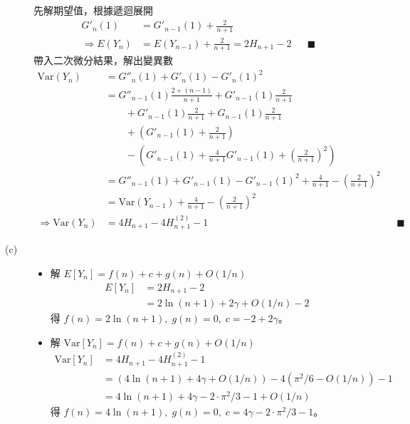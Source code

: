 \documentclass[11pt,fleqn]{article}
\begin{document}
\begin{description}
		先解期望值，根據遞迴展開
		\begin{align*}
			{G}'_n(1) &= {G}'_{n-1}(1) + \frac{2}{n+1} \\
			\Rightarrow
				E(Y_n) &= E(Y_{n-1}) + \frac{2}{n+1} = 2 H_{n+1} - 2 && \blacksquare
		\end{align*}
		帶入二次微分結果，解出變異數
		\begin{align*}
			\text{Var}(Y_n) &= {G}''_n(1) + {G}'_n(1) - {G}'_n(1)^2 \\
			&= {G}''_{n-1}(1) \frac{2 + (n-1)}{n+1} + {G}'_{n-1}(1) \frac{2}{n+1} \\
			& \qquad + {G}'_{n-1}(1)\frac{2}{n+1} + G_{n-1}(1) \frac{2}{n+1} \\
			& \qquad + \left( {G}'_{n-1}(1) + \frac{2}{n+1} \right)\\
			& \qquad - \left( {G}'_{n-1}(1) + \frac{4}{n+1} {G}'_{n-1}(1) + \left(\frac{2}{n+1}\right)^2 \right) \\
			&= {G}''_{n-1}(1) + {G}'_{n-1}(1) - {G}'_{n-1}(1)^2 + \frac{4}{n+1} - \left(\frac{2}{n+1}\right)^2 \\
			&= \text{Var}(Y_{n-1}) + \frac{4}{n+1} - \left(\frac{2}{n+1}\right)^2 \\
			\Rightarrow
				\text{Var}(Y_n) &= 4 H_{n+1} - 4 H^{(2)}_{n+1} - 1 && \blacksquare
		\end{align*}
	\item[(c)] 
		\begin{itemize}
			\item 解 $E[Y_n] = f(n) + c + g(n) + O(1/n)$
			\begin{align*}
				E[Y_n] 
				&= 2 H_{n+1} - 2 \\
				&= 2 \ln (n+1) + 2 \gamma + O(1/n) - 2
			\end{align*}
			得 $f(n) = 2\ln (n+1), \; g(n) = 0, \; c = -2 + 2 \gamma$。
			\item 解 $\text{Var}[Y_n] = f(n) + c + g(n) + O(1/n)$
			\begin{align*}
				\text{Var}[Y_n] 
					&= 4 H_{n+1} - 4 H^{(2)}_{n+1} - 1 \\
					&= \left(4 \ln (n+1) + 4 \gamma + O(1/n)\right)
						- 4 \left( \pi^2 / 6 - O(1/n)\right) - 1 \\
					&= 4 \ln (n+1) + 4 \gamma - 2 \cdot \pi^2 / 3 - 1 + O(1/n)
			\end{align*}
			得 $f(n) = 4\ln (n+1), \; g(n) = 0, \; c = 4 \gamma - 2 \cdot \pi^2 / 3 - 1$。
		\end{itemize}
\end{description}
\end{document}
